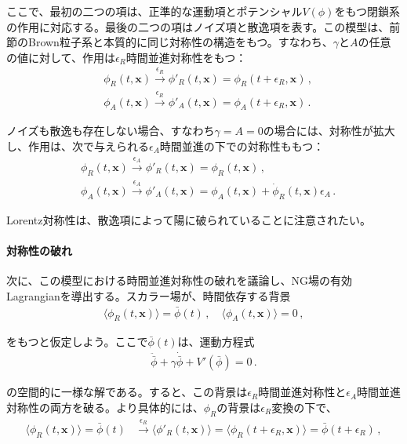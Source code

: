 ここで、最初の二つの項は、正準的な運動項とポテンシャル$V(\phi)$をもつ閉鎖系の作用に対応する。最後の二つの項はノイズ項と散逸項を表す。この模型は、前節のBrown粒子系と本質的に同じ対称性の構造をもつ。すなわち、$\gamma$と$A$の任意の値に対して、作用は$\epsilon_R$時間並進対称性をもつ：
\begin{align}
\nonumber
 &\phi_R (t,\mathbf{x}) 
 \xrightarrow { \epsilon_R }  \phi'_R(t,\mathbf{x}) = \phi_R (t+\epsilon_R,\mathbf{x})
 \,,
 \\
&\phi_A (t,\mathbf{x})
 \xrightarrow { \epsilon_R } \phi'_A (t,\mathbf{x}) = \phi_A (t+\epsilon_R,\mathbf{x})\,.
\end{align}

ノイズも散逸も存在しない場合、すなわち$\gamma=A=0$の場合には、対称性が拡大し、作用は、次で与えられる$\epsilon_A$時間並進の下での対称性ももつ：
\begin{align}
 \nonumber
 &\phi_R(t,\mathbf{x})
 \xrightarrow { \epsilon_A } \phi'_R(t,\mathbf{x}) = \phi_R(t,\mathbf{x}) 
 \,,
 \\
 &\phi_A (t,\mathbf{x})
 \xrightarrow { \epsilon_A } \phi'_A (t,\mathbf{x}) = \phi_A (t,\mathbf{x})+\dot{\phi}_R (t,\mathbf{x})\epsilon_A  \,.
\end{align}

Lorentz対称性は、散逸項によって陽に破られていることに注意されたい。

\paragraph{対称性の破れ}
次に、この模型における時間並進対称性の破れを議論し、NG場の有効Lagrangianを導出する。スカラー場が、時間依存する背景
\begin{align}
\langle\phi_R (t,\mathbf{x})\rangle
 =\bar{\phi}(t)\,, \quad \langle\phi_A (t,\mathbf{x})\rangle=0\,,
\end{align}

をもつと仮定しよう。ここで$\bar{\phi}(t)$は、運動方程式
\begin{align}
\label{EMO:phibar}
\ddot{\bar{\phi}}+\gamma\dot{\bar{\phi}}+V'(\bar{\phi})=0\,.
\end{align}

の空間的に一様な解である。すると、この背景は$\epsilon_R$時間並進対称性と$\epsilon_A$時間並進対称性の両方を破る。より具体的には、$\phi_R$の背景は$\epsilon_R$変換の下で、
\begin{align}
\label{transf_backgrounds}
 \langle\phi_R (t,\mathbf{x})\rangle 
 = \bar{\phi}(t) &\xrightarrow { \epsilon_R } \langle \phi'_R (t,\mathbf{x})\rangle =
 \langle \phi_R(t+\epsilon_R,\mathbf{x})\rangle=\bar{\phi}(t+\epsilon_R) 
 \,,
\end{align}

